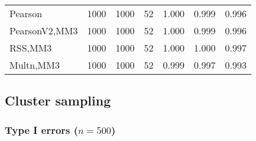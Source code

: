 \documentclass[
]{article}
\begin{document}
\begin{table}[H]
{\begin{tabular}[t]{lrrrrrr}
\hspace{1em}Pearson & 1000 & 1000 & 52 & 1.000 & 0.999 & 0.996\\
\hspace{1em}PearsonV2,MM3 & 1000 & 1000 & 52 & 1.000 & 0.999 & 0.996\\
\hspace{1em}RSS,MM3 & 1000 & 1000 & 52 & 1.000 & 1.000 & 0.997\\
\hspace{1em}Multn,MM3 & 1000 & 1000 & 52 & 0.999 & 0.997 & 0.993\\
\bottomrule
\end{tabular}}
\end{table}

\hypertarget{cluster-sampling}{%
\subsection{Cluster sampling}\label{cluster-sampling}}

\hypertarget{type-i-errors-n500-2}{%
\subsubsection{\texorpdfstring{Type I errors
(\(n=500\))}{Type I errors (n=500)}}\label{type-i-errors-n500-2}}
\end{document}

